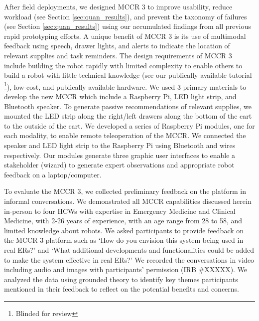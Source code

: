 After field deployments, we designed MCCR 3 to improve usability, reduce workload (see Section \ref{sec:quan_results}), and prevent the taxonomy of failures (see Section \ref{sec:quan_results}) using our accumulated findings from all previous rapid prototyping efforts.%
A unique benefit of MCCR 3 is its use of multimodal feedback using speech, drawer lights, and alerts to indicate the location of relevant supplies and task reminders.
The design requirements of MCCR 3 include building the robot rapidly with limited complexity to enable others to build a robot with little technical knowledge (see our publically available tutorial \footnote{Blinded for review}), low-cost, and publically available hardware.
We used 3 primary materials to develop the new MCCR which include a Raspberry Pi, LED light strip, and Bluetooth speaker.
To generate passive recommendations of relevant supplies, we mounted the LED strip along the right/left drawers along the bottom of the cart to the outside of the cart.
We developed a series of Raspberry Pi modules, one for each modality, to enable remote teleoperation of the MCCR.
We connected the speaker and LED light strip to the Raspberry Pi using Bluetooth and wires respectively.
Our modules generate three graphic user interfaces to enable a stakeholder (wizard) to generate expert observations and appropriate robot feedback on a laptop/computer.


To evaluate the MCCR 3, we collected preliminary feedback on the platform in informal conversations.
We demonstrated all MCCR capabilities discussed herein in-person to four HCWs with expertise in Emergency Medicine and Clinical Medicine, with 2-26 years of experience, with an age range from 28 to 58, and limited knowledge about robots.
We asked participants to provide feedback on the MCCR 3 platform such as `How do you envision this system being used in real ERs?’ and `What additional developments and functionalities could be added to make the system effective in real ERs?’
We recorded the conversations in video including audio and images with participants' permission (IRB \#XXXXX).
We analyzed the data using grounded theory to identify key themes participants mentioned in their feedback to reflect on the potential benefits and concerns.

